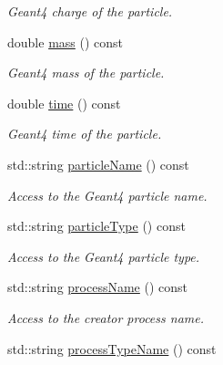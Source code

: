 \begin{DoxyCompactItemize}
\begin{DoxyCompactList}\small\item\em Geant4 charge of the particle. \item\end{DoxyCompactList}\item 
double \hyperlink{class_d_d4hep_1_1_simulation_1_1_geant4_particle_handle_ae404682b2a931f51b7640f63e2226297}{mass} () const 
\begin{DoxyCompactList}\small\item\em Geant4 mass of the particle. \item\end{DoxyCompactList}\item 
double \hyperlink{class_d_d4hep_1_1_simulation_1_1_geant4_particle_handle_a014d5ea77dd47e536e99926c39aa79c6}{time} () const 
\begin{DoxyCompactList}\small\item\em Geant4 time of the particle. \item\end{DoxyCompactList}\item 
std::string \hyperlink{class_d_d4hep_1_1_simulation_1_1_geant4_particle_handle_a3fddc59cc15be7f8a1ff3177fe57ed2b}{particleName} () const 
\begin{DoxyCompactList}\small\item\em Access to the Geant4 particle name. \item\end{DoxyCompactList}\item 
std::string \hyperlink{class_d_d4hep_1_1_simulation_1_1_geant4_particle_handle_a5930424c9e95d4688fb0c0e9ce0965ee}{particleType} () const 
\begin{DoxyCompactList}\small\item\em Access to the Geant4 particle type. \item\end{DoxyCompactList}\item 
std::string \hyperlink{class_d_d4hep_1_1_simulation_1_1_geant4_particle_handle_a3ac24454a926713d25ecc8db7595a55b}{processName} () const 
\begin{DoxyCompactList}\small\item\em Access to the creator process name. \item\end{DoxyCompactList}\item 
std::string \hyperlink{class_d_d4hep_1_1_simulation_1_1_geant4_particle_handle_a0f3b949e212e645bf8fe817f2cb4202c}{processTypeName} () const 

\end{DoxyCompactItemize}
